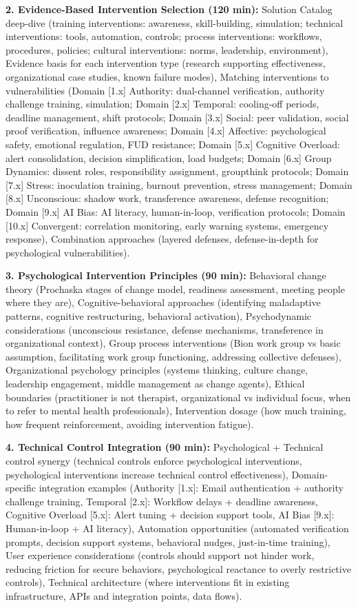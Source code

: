 \documentclass[11pt,a4paper]{article}
\begin{document}
\textbf{2. Evidence-Based Intervention Selection (120 min):} Solution Catalog deep-dive (training interventions: awareness, skill-building, simulation; technical interventions: tools, automation, controls; process interventions: workflows, procedures, policies; cultural interventions: norms, leadership, environment), Evidence basis for each intervention type (research supporting effectiveness, organizational case studies, known failure modes), Matching interventions to vulnerabilities (Domain [1.x] Authority: dual-channel verification, authority challenge training, simulation; Domain [2.x] Temporal: cooling-off periods, deadline management, shift protocols; Domain [3.x] Social: peer validation, social proof verification, influence awareness; Domain [4.x] Affective: psychological safety, emotional regulation, FUD resistance; Domain [5.x] Cognitive Overload: alert consolidation, decision simplification, load budgets; Domain [6.x] Group Dynamics: dissent roles, responsibility assignment, groupthink protocols; Domain [7.x] Stress: inoculation training, burnout prevention, stress management; Domain [8.x] Unconscious: shadow work, transference awareness, defense recognition; Domain [9.x] AI Bias: AI literacy, human-in-loop, verification protocols; Domain [10.x] Convergent: correlation monitoring, early warning systems, emergency response), Combination approaches (layered defenses, defense-in-depth for psychological vulnerabilities).

\textbf{3. Psychological Intervention Principles (90 min):} Behavioral change theory (Prochaska stages of change model, readiness assessment, meeting people where they are), Cognitive-behavioral approaches (identifying maladaptive patterns, cognitive restructuring, behavioral activation), Psychodynamic considerations (unconscious resistance, defense mechanisms, transference in organizational context), Group process interventions (Bion work group vs basic assumption, facilitating work group functioning, addressing collective defenses), Organizational psychology principles (systems thinking, culture change, leadership engagement, middle management as change agents), Ethical boundaries (practitioner is not therapist, organizational vs individual focus, when to refer to mental health professionals), Intervention dosage (how much training, how frequent reinforcement, avoiding intervention fatigue).

\textbf{4. Technical Control Integration (90 min):} Psychological + Technical control synergy (technical controls enforce psychological interventions, psychological interventions increase technical control effectiveness), Domain-specific integration examples (Authority [1.x]: Email authentication + authority challenge training, Temporal [2.x]: Workflow delays + deadline awareness, Cognitive Overload [5.x]: Alert tuning + decision support tools, AI Bias [9.x]: Human-in-loop + AI literacy), Automation opportunities (automated verification prompts, decision support systems, behavioral nudges, just-in-time training), User experience considerations (controls should support not hinder work, reducing friction for secure behaviors, psychological reactance to overly restrictive controls), Technical architecture (where interventions fit in existing infrastructure, APIs and integration points, data flows).
\end{document}
